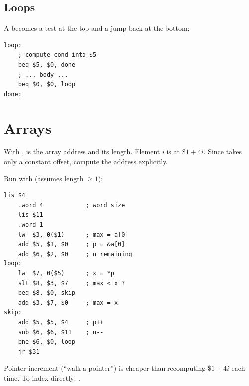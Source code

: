 \subsection{Loops}
A  becomes a test at the top and a jump back at the bottom:
\begin{lstlisting}[style=mips]
loop:
    ; compute cond into $5
    beq $5, $0, done
    ; ... body ...
    beq $0, $0, loop
done:
\end{lstlisting}

\section{Arrays}

With ,  is the array address and  its length.
Element $i$ is at $\$1 + 4i$. Since  takes only a constant offset, compute the
address explicitly.

\begin{example}
Run with  (assumes length $\ge 1$):
\begin{lstlisting}[style=mips]
    lis $4
    .word 4            ; word size
    lis $11
    .word 1
    lw  $3, 0($1)      ; max = a[0]
    add $5, $1, $0     ; p = &a[0]
    add $6, $2, $0     ; n remaining
loop:
    lw  $7, 0($5)      ; x = *p
    slt $8, $3, $7     ; max < x ?
    beq $8, $0, skip
    add $3, $7, $0     ; max = x
skip:
    add $5, $5, $4     ; p++
    sub $6, $6, $11    ; n--
    bne $6, $0, loop
    jr $31
\end{lstlisting}
Pointer increment (``walk a pointer'') is cheaper than recomputing $\$1 + 4i$ each time.
To index directly: .
\begin{center}
\end{center}
\end{example}

